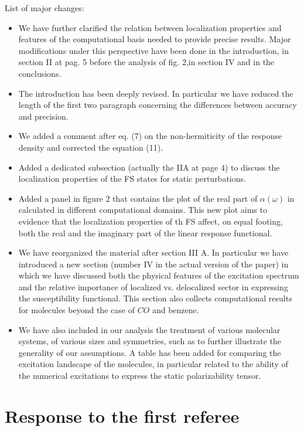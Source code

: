 \documentclass[11pt,a4paper]{article}
\begin{document}

List of major changes:
\begin{itemize}
 \item We have further clarified the relation between localization properties and features of the computational basis needed
 to provide precise results. Major modifications under this perspective have been done in the introduction, in section II at pag. 5 before the analysis of fig. 2,in section IV and in the conclusions.
 \item The introduction has been deeply revised. In particular we have reduced the length of the first two paragraph concerning the differences between accuracy and precision.
 \item We added a comment after eq. (7) on the non-hermiticity of the response density and corrected the equation (11).
 \item Added a dedicated subsection (actually the IIA at page 4)  to discuss the localization properties of the FS states for static perturbations.
 \item Added a panel in figure 2 that contains the plot of the real part of $\alpha(\omega)$ in calculated in different computational domains. This new plot aims to evidence that the localization
 properties of th FS affect, on equal footing, both the real and the imaginary part of the linear response functional.
 \item We have reorganized the material after section III A. In particular we have introduced a new section (number IV in the actual version of the paper) in which we have discussed both the physical features of the excitation spectrum and the relative importance of localized vs. delocalized sector in expressing the susceptibility functional. This section also collects computational results for molecules beyond the case of $CO$ and benzene.
 \item We have also included in our analysis the treatment of various molecular systems, of various sizes and symmetries, such as to further illustrate the generality of our assumptions. A table has been added for comparing the excitation landscape of the molecules, in particular related to the ability of the numerical excitations to
 express the static polarizability tensor.
\end{itemize}

\section*{Response to the first referee}
\end{document}
